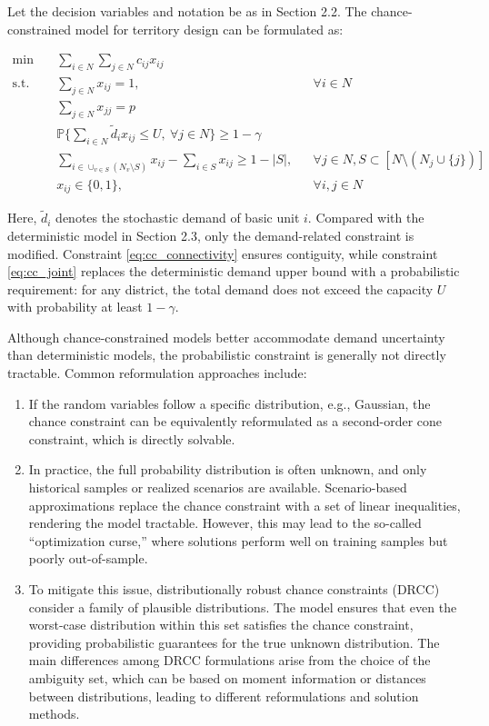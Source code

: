 \documentclass[preprint,12pt,authoryear]{elsarticle}
\begin{document}
Let the decision variables and notation be as in Section 2.2. The chance-constrained model for territory design can be formulated as:

\begin{align}
\min \quad & \sum_{i\in N}\sum_{j\in N} c_{ij} x_{ij} \label{eq:cc_obj} \\
\text{s.t.} \quad & \sum_{j\in N} x_{ij} = 1, && \forall i \in N \label{eq:cc_assign} \\
& \sum_{j\in N} x_{jj} = p \label{eq:cc_districts} \\
& \mathbb{P}\Bigg\{\sum_{i\in N} \widetilde{d}_i x_{ij} \leqslant U, \ \forall j \in N \Bigg\} \geqslant 1-\gamma \label{eq:cc_joint} \\
& \sum_{i\in \cup_{v\in S} (N_v \setminus S)} x_{ij} - \sum_{i\in S} x_{ij} \geqslant 1 - |S|, && \forall j \in N, S \subset [N \setminus (N_j \cup \{j\})] \label{eq:cc_connectivity} \\
& x_{ij} \in \{0,1\}, && \forall i,j \in N \label{eq:cc_binary}
\end{align}

Here, $\widetilde{d}_i$ denotes the stochastic demand of basic unit $i$. Compared with the deterministic model in Section 2.3, only the demand-related constraint is modified. Constraint \eqref{eq:cc_connectivity} ensures contiguity, while constraint \eqref{eq:cc_joint} replaces the deterministic demand upper bound with a probabilistic requirement: for any district, the total demand does not exceed the capacity $U$ with probability at least $1-\gamma$.

Although chance-constrained models better accommodate demand uncertainty than deterministic models, the probabilistic constraint is generally not directly tractable. Common reformulation approaches include:

\begin{enumerate}
    \item If the random variables follow a specific distribution, e.g., Gaussian, the chance constraint can be equivalently reformulated as a second-order cone constraint, which is directly solvable.
    \item In practice, the full probability distribution is often unknown, and only historical samples or realized scenarios are available. Scenario-based approximations replace the chance constraint with a set of linear inequalities, rendering the model tractable. However, this may lead to the so-called ``optimization curse,'' where solutions perform well on training samples but poorly out-of-sample.
    \item To mitigate this issue, distributionally robust chance constraints (DRCC) consider a family of plausible distributions. The model ensures that even the worst-case distribution within this set satisfies the chance constraint, providing probabilistic guarantees for the true unknown distribution. The main differences among DRCC formulations arise from the choice of the ambiguity set, which can be based on moment information or distances between distributions, leading to different reformulations and solution methods.
\end{enumerate}
\end{document}
